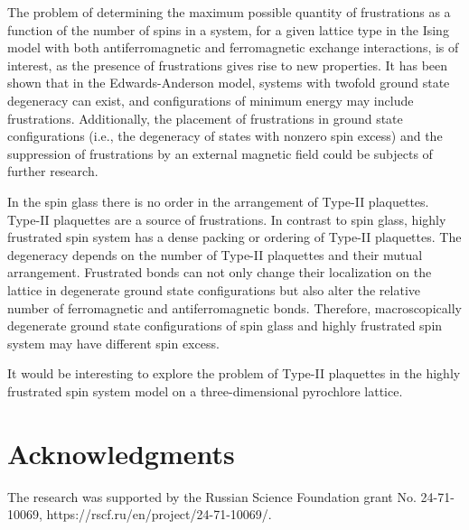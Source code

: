 \documentclass[preprint,12pt]{elsarticle}
\begin{document}
	The problem of determining the maximum possible quantity of frustrations as a function of the number of spins in a system, for a given lattice type in the Ising model with both antiferromagnetic and ferromagnetic exchange interactions, is of interest, as the presence of frustrations gives rise to new properties.
	It has been shown that in the Edwards-Anderson model, systems with twofold ground state degeneracy can exist, and configurations of minimum energy may include frustrations. Additionally, the placement of frustrations in ground state configurations (i.e., the degeneracy of states with nonzero spin excess) and the suppression of frustrations by an external magnetic field could be subjects of further research.
	
	In the spin glass there is no order in the arrangement of Type-II plaquettes.
	Type-II plaquettes are a source of frustrations.
	In contrast to spin glass, highly frustrated spin system has a dense packing or ordering of Type-II plaquettes.  
	The degeneracy depends on the number of Type-II plaquettes and their mutual arrangement.
	Frustrated bonds can not only change their localization on the lattice in degenerate ground state configurations but also alter the relative number of ferromagnetic and antiferromagnetic bonds.  
	Therefore, macroscopically degenerate ground state configurations of spin glass and highly frustrated spin system may have different spin excess.
	
	It would be interesting to explore the problem of Type-II plaquettes in the highly frustrated spin system model on a three-dimensional pyrochlore lattice.
	
	\section{Acknowledgments}
	
	The research was supported by the Russian Science Foundation grant No. 24-71-10069, https://rscf.ru/en/project/24-71-10069/.
	
	
	
	
\end{document}
